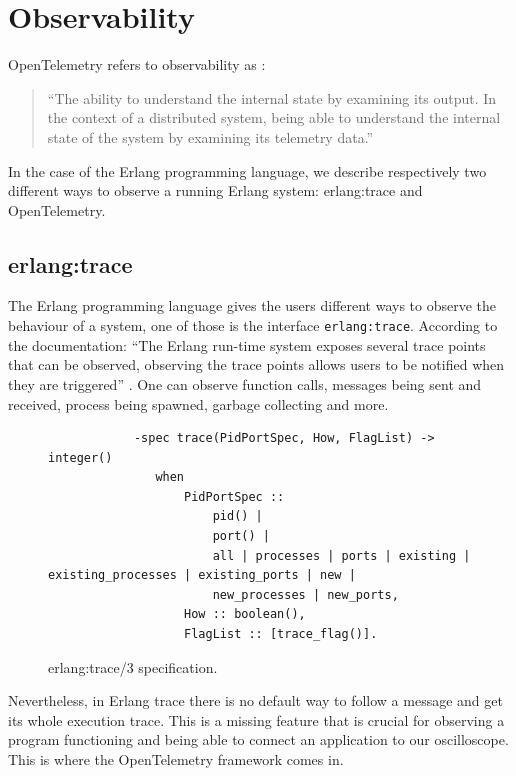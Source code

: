 \section{Observability}
    OpenTelemetry refers to observability as \cite{otel-o}:
    \begin{quote}
 ``The ability to understand the internal state by examining its output. In the context of a distributed system, being able to understand the internal state of the system by examining its telemetry data.''
    \end{quote}
    In the case of the Erlang programming language, we describe respectively two different ways to observe a running Erlang system: erlang:trace and OpenTelemetry.
    
    \subsection{erlang:trace}
        The Erlang programming language gives the users different ways to observe the behaviour of a system, one of those is the interface \texttt{erlang:trace}. According to the documentation: ``The Erlang run-time system exposes several trace points that can be observed, observing the trace points allows users to be notified when they are triggered'' \cite{erlang-t}. One can observe function calls, messages being sent and received, process being spawned, garbage collecting and more. 
        \begin{figure}[!ht]
        \centering
        \begin{verbatim}
            -spec trace(PidPortSpec, How, FlagList) -> integer()
               when
                   PidPortSpec ::
                       pid() |
                       port() |
                       all | processes | ports | existing | existing_processes | existing_ports | new |
                       new_processes | new_ports,
                   How :: boolean(),
                   FlagList :: [trace_flag()].
        \end{verbatim}
            \caption{erlang:trace/3 specification. \cite{erlang-t}}
\end{figure}

    Nevertheless, in Erlang trace there is no default way to follow a message and get its whole execution trace. This is a missing feature that is crucial for observing a program functioning and being able to connect an application to our oscilloscope.  This is where the OpenTelemetry framework comes in.

